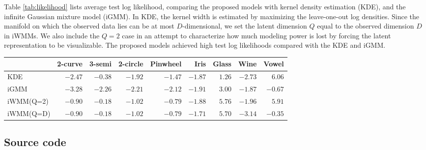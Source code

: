 Table \ref{tab:likelihood} lists average test log likelihood, comparing the proposed models
with kernel density estimation (KDE),
and the infinite Gaussian mixture model (iGMM).
In KDE, the kernel width is estimated by maximizing the leave-one-out log densities.
Since the manifold on which the observed data lies can be at most $D$-dimensional, we set the latent dimension $Q$ equal to the observed dimension $D$ in iWMMs.
We also include the $Q=2$ case in an attempt to characterize how much modeling power is lost by forcing the latent representation to be visualizable. 
The proposed models achieved high test log likelihoods compared with the KDE and iGMM.

\begin{table*}[ht!]
\centering
\caption{Average test log likelihood for evaluating density estimation performance.}
\label{tab:likelihood}
\begin{tabular}{lrrrrrrrr}
\hline
& 2-curve & 3-semi & 2-circle & Pinwheel & Iris  & Glass  & Wine  & Vowel  \\
\hline 
KDE & $-2.47$ & $-0.38$ & $-1.92$ & $-1.47$ & $\mathbf{-1.87}$ & $1.26$ & $-2.73$ & $\mathbf{6.06}$ \\
iGMM & $-3.28$ & $-2.26$ & $-2.21$ & $-2.12$ & $-1.91$ & $3.00$ & $\mathbf{-1.87}$ & $-0.67$ \\
iWMM(Q=2) & $\mathbf{-0.90}$ & $\mathbf{-0.18}$ & $\mathbf{-1.02}$ & $\mathbf{-0.79}$ & $\mathbf{-1.88}$ & $\mathbf{5.76}$ & $\mathbf{-1.96}$ & $\mathbf{5.91}$ \\
iWMM(Q=D) & $\mathbf{-0.90}$ & $\mathbf{-0.18}$ & $\mathbf{-1.02}$ & $\mathbf{-0.79}$ & $\mathbf{-1.71}$ & $\mathbf{5.70}$ & $-3.14$ & $-0.35$ \\
\hline
\end{tabular}
\end{table*}

\subsection{Source code}

